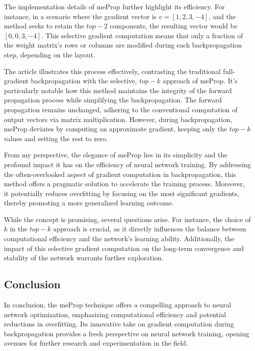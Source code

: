 The implementation details of meProp further highlight its efficiency. For instance, in a scenario where the gradient vector is $v = [1, 2, 3, -4]$, and the method seeks to retain the $top-2$ components, the resulting vector would be $[0, 0, 3, -4]$. This selective gradient computation means that only a fraction of the weight matrix's rows or columns are modified during each backpropagation step, depending on the layout.

The article illustrates this process effectively, contrasting the traditional full-gradient backpropagation with the selective, $top-k$ approach of meProp. It's particularly notable how this method maintains the integrity of the forward propagation process while simplifying the backpropagation. The forward propagation remains unchanged, adhering to the conventional computation of output vectors via matrix multiplication. However, during backpropagation, meProp deviates by computing an approximate gradient, keeping only the $top-k$ values and setting the rest to zero.

From my perspective, the elegance of meProp lies in its simplicity and the profound impact it has on the efficiency of neural network training. By addressing the often-overlooked aspect of gradient computation in backpropagation, this method offers a pragmatic solution to accelerate the training process. Moreover, it potentially reduces overfitting by focusing on the most significant gradients, thereby promoting a more generalized learning outcome.

While the concept is promising, several questions arise. For instance, the choice of $k$ in the $top-k$ approach is crucial, as it directly influences the balance between computational efficiency and the network's learning ability. Additionally, the impact of this selective gradient computation on the long-term convergence and stability of the network warrants further exploration.

\subsection{Conclusion}

In conclusion, the meProp technique offers a compelling approach to neural network optimization, emphasizing computational efficiency and potential reductions in overfitting. Its innovative take on gradient computation during backpropagation provides a fresh perspective on neural network training, opening avenues for further research and experimentation in the field.

